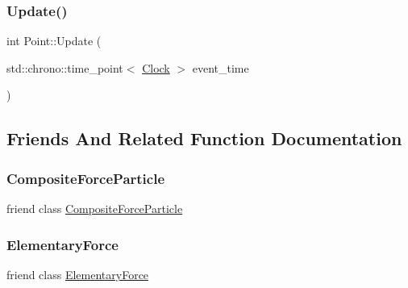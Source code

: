 \mbox{\label{classPoint_a7ad2d1933410012c59bffbd4ac611279}} 
\subsubsection{\texorpdfstring{Update()}{Update()}}
{\footnotesize\ttfamily int Point\+::\+Update (\begin{DoxyParamCaption}\item[{std\+::chrono\+::time\+\_\+point$<$ \mbox{\hyperlink{universe_8h_a0ef8d951d1ca5ab3cfaf7ab4c7a6fd80}{Clock}} $>$}]{event\+\_\+time }\end{DoxyParamCaption})}



\subsection{Friends And Related Function Documentation}
\mbox{\label{classPoint_a9bc6eb2a4c20ce83728a7c9a31b91f19}} 
\subsubsection{\texorpdfstring{Composite\+Force\+Particle}{CompositeForceParticle}}
{\footnotesize\ttfamily friend class \mbox{\hyperlink{classCompositeForceParticle}{Composite\+Force\+Particle}}\hspace{0.3cm}{\ttfamily [friend]}}

\mbox{\label{classPoint_a6e57500586e9cd366f5cf76ea0299957}} 
\subsubsection{\texorpdfstring{Elementary\+Force}{ElementaryForce}}
{\footnotesize\ttfamily friend class \mbox{\hyperlink{classElementaryForce}{Elementary\+Force}}\hspace{0.3cm}{\ttfamily [friend]}}

\mbox{\label{classPoint_af2ace341c1d7ccd30de3502502773591}} 
